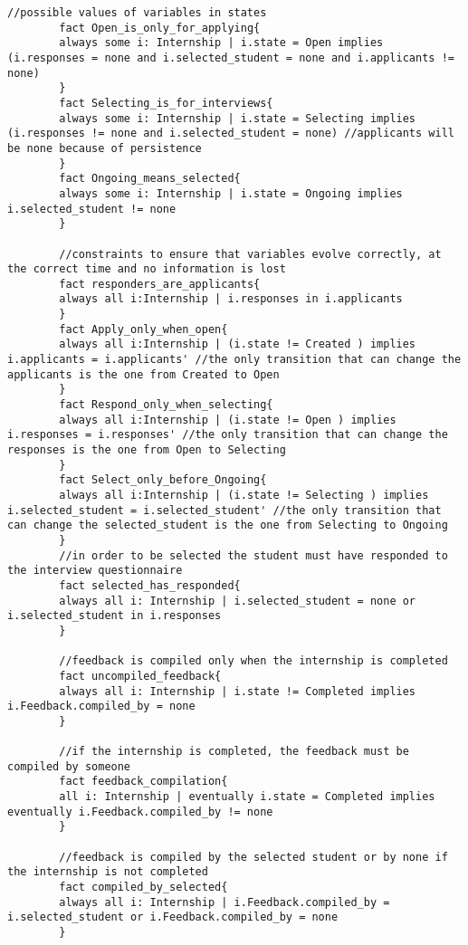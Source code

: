 \begin{lstlisting}[language=Alloy]
        //possible values of variables in states
        fact Open_is_only_for_applying{
        always some i: Internship | i.state = Open implies (i.responses = none and i.selected_student = none and i.applicants != none)
        }
        fact Selecting_is_for_interviews{
        always some i: Internship | i.state = Selecting implies (i.responses != none and i.selected_student = none) //applicants will be none because of persistence
        }
        fact Ongoing_means_selected{
        always some i: Internship | i.state = Ongoing implies i.selected_student != none
        }
        
        //constraints to ensure that variables evolve correctly, at the correct time and no information is lost
        fact responders_are_applicants{
        always all i:Internship | i.responses in i.applicants
        }
        fact Apply_only_when_open{
        always all i:Internship | (i.state != Created ) implies i.applicants = i.applicants' //the only transition that can change the applicants is the one from Created to Open
        }
        fact Respond_only_when_selecting{
        always all i:Internship | (i.state != Open ) implies i.responses = i.responses' //the only transition that can change the responses is the one from Open to Selecting
        }
        fact Select_only_before_Ongoing{
        always all i:Internship | (i.state != Selecting ) implies i.selected_student = i.selected_student' //the only transition that can change the selected_student is the one from Selecting to Ongoing
        }
        //in order to be selected the student must have responded to the interview questionnaire
        fact selected_has_responded{
        always all i: Internship | i.selected_student = none or i.selected_student in i.responses
        }
        
        //feedback is compiled only when the internship is completed
        fact uncompiled_feedback{
        always all i: Internship | i.state != Completed implies i.Feedback.compiled_by = none
        }
        
        //if the internship is completed, the feedback must be compiled by someone
        fact feedback_compilation{
        all i: Internship | eventually i.state = Completed implies eventually i.Feedback.compiled_by != none
        }
        
        //feedback is compiled by the selected student or by none if the internship is not completed
        fact compiled_by_selected{
        always all i: Internship | i.Feedback.compiled_by = i.selected_student or i.Feedback.compiled_by = none
        }
        

\end{lstlisting}
